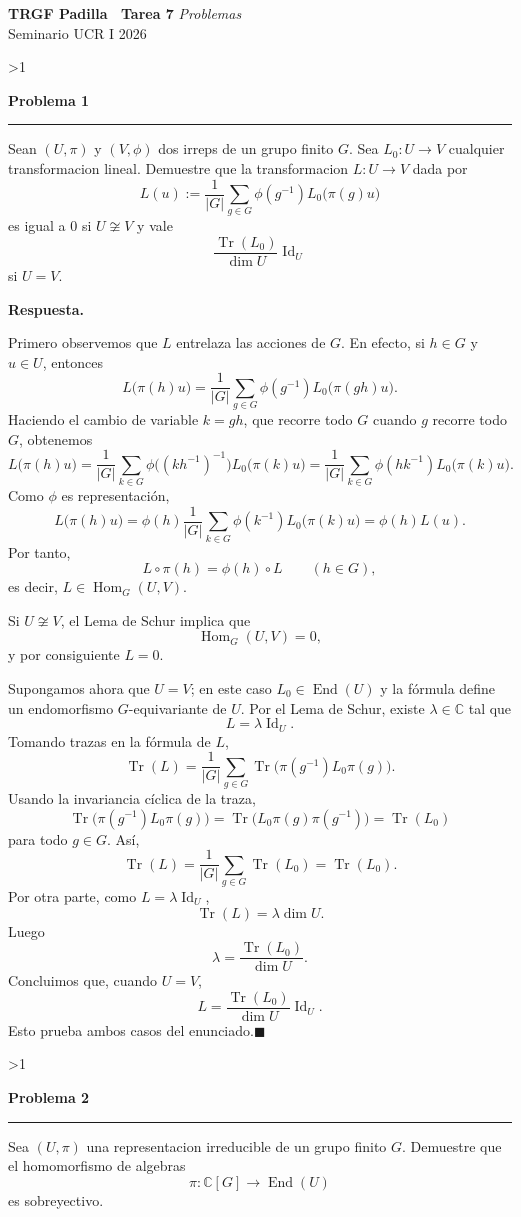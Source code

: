 \documentclass[10pt,a4paper]{article}
\newcommand{\CC}{\mathbb{C}}
\newcommand{\inlinehead}[2][repblue]{%
  \par\smallskip
  {\color{#1}\bfseries #2.}\hspace{0.45em}%
}
\newcommand{\answer}{\inlinehead{Respuesta}}
\newcommand{\topbanner}{%
  \begin{tcolorbox}[
    colback=replight,
    colframe=repline,
    borderline west={1.2pt}{0pt}{repblue},
    borderline east={1.2pt}{0pt}{repteal},
    left=1.0em,
    right=1.0em,
    top=0.7em,
    bottom=0.55em
  ]
    {\Large\bfseries\color{repblue} TRGF Padilla \textemdash\ Tarea 7}\hfill
    {\color{repaccent}\small\itshape Problemas}\\[-0.1em]
    {\normalsize\color{repteal} Seminario UCR I 2026}
  \end{tcolorbox}
}
\newcounter{probcnt}
\newcommand{\problem}[2]{%
  \stepcounter{probcnt}%
  \ifnum\value{probcnt}>1\newpage\fi
  \par\vspace{0.25em}
  {\large\bfseries\color{repblue} Problema #1}\par
  {\color{repline}\rule{\linewidth}{0.55pt}}\par
  \begin{tcolorbox}[
    breakable,
    colback=white,
    colframe=repline,
    borderline west={1.6pt}{0pt}{repteal},
    left=0.7em,
    right=0.7em,
    top=0.35em,
    bottom=0.3em,
    before skip=0.35em,
    after skip=0.45em
  ]
    #2
  \end{tcolorbox}
}
\begin{document}
\color{black}
\topbanner
\small

\problem{1}{%
Sean $(U,\pi)$ y $(V,\phi)$ dos irreps de un grupo finito $G$. Sea
$L_0:U\to V$ cualquier transformacion lineal. Demuestre que la transformacion
$L:U\to V$ dada por
\[
  L(u):=\frac{1}{|G|}\sum_{g\in G}\phi(g^{-1})L_0\bigl(\pi(g)u\bigr)
\]
es igual a $0$ si $U\not\cong V$ y vale
\[
  \frac{\operatorname{Tr}(L_0)}{\dim U}\operatorname{Id}_U
\]
si $U=V$.
}

\answer
Primero observemos que $L$ entrelaza las acciones de $G$. En efecto, si
$h\in G$ y $u\in U$, entonces
\[
  L\bigl(\pi(h)u\bigr)
  =\frac{1}{|G|}\sum_{g\in G}\phi(g^{-1})L_0\bigl(\pi(gh)u\bigr).
\]
Haciendo el cambio de variable $k=gh$, que recorre todo $G$ cuando $g$ recorre
todo $G$, obtenemos
\[
  L\bigl(\pi(h)u\bigr)
  =\frac{1}{|G|}\sum_{k\in G}\phi\bigl((kh^{-1})^{-1}\bigr)L_0\bigl(\pi(k)u\bigr)
  =\frac{1}{|G|}\sum_{k\in G}\phi(hk^{-1})L_0\bigl(\pi(k)u\bigr).
\]
Como $\phi$ es representación,
\[
  L\bigl(\pi(h)u\bigr)
  =\phi(h)\frac{1}{|G|}\sum_{k\in G}\phi(k^{-1})L_0\bigl(\pi(k)u\bigr)
  =\phi(h)L(u).
\]
Por tanto,
\[
  L\circ\pi(h)=\phi(h)\circ L
  \qquad (h\in G),
\]
es decir, $L\in \operatorname{Hom}_G(U,V)$.

Si $U\not\cong V$, el Lema de Schur implica que
\[
  \operatorname{Hom}_G(U,V)=0,
\]
y por consiguiente $L=0$.

Supongamos ahora que $U=V$; en este caso $L_0\in \operatorname{End}(U)$ y la
fórmula define un endomorfismo $G$-equivariante de $U$. Por el Lema de Schur,
existe $\lambda\in\CC$ tal que
\[
  L=\lambda\operatorname{Id}_U.
\]
Tomando trazas en la fórmula de $L$,
\[
  \operatorname{Tr}(L)
  =\frac{1}{|G|}\sum_{g\in G}\operatorname{Tr}\bigl(\pi(g^{-1})L_0\pi(g)\bigr).
\]
Usando la invariancia cíclica de la traza,
\[
  \operatorname{Tr}\bigl(\pi(g^{-1})L_0\pi(g)\bigr)
  =\operatorname{Tr}\bigl(L_0\pi(g)\pi(g^{-1})\bigr)
  =\operatorname{Tr}(L_0)
\]
para todo $g\in G$. Así,
\[
  \operatorname{Tr}(L)
  =\frac{1}{|G|}\sum_{g\in G}\operatorname{Tr}(L_0)
  =\operatorname{Tr}(L_0).
\]
Por otra parte, como $L=\lambda\operatorname{Id}_U$,
\[
  \operatorname{Tr}(L)=\lambda\dim U.
\]
Luego
\[
  \lambda=\frac{\operatorname{Tr}(L_0)}{\dim U}.
\]
Concluimos que, cuando $U=V$,
\[
  L=\frac{\operatorname{Tr}(L_0)}{\dim U}\operatorname{Id}_U.
\]
Esto prueba ambos casos del enunciado.\hfill$\blacksquare$

\problem{2}{%
Sea $(U,\pi)$ una representacion irreducible de un grupo finito $G$.
Demuestre que el homomorfismo de algebras
\[
  \pi:\CC[G]\to \operatorname{End}(U)
\]
es sobreyectivo.
}
\end{document}
